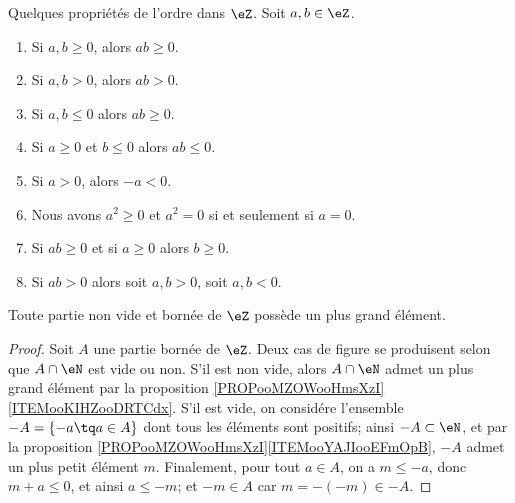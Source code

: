 \begin{proposition}	\label{PROPooYFUBooJUZgwH}
	Quelques propriétés de l'ordre dans \( \eZ\). Soit \( a, b \in \eZ\).
	\begin{enumerate}
		\item		\label{ITEMooULKWooLmKBse}
		      Si \( a,b\geq 0\), alors \( ab\geq 0\).
		\item	\label{ITEMooSAJPooEDSgXJ}
		      Si \( a,b>0\), alors \( ab>0\).
		\item		\label{ITEMooINGNooOgSGiF}
		      Si \( a,b\leq 0\) alors \( ab\geq 0\).
		\item	\label{ITEMooOGFXooDvLKAE}
		      Si \( a\geq 0\) et \( b\leq 0\) alors \( ab\leq 0\).
		\item	\label{ITEMooRelatifsOrdreOppose}
		      Si \( a>0\), alors \( -a<0\).
		\item	\label{ITEMooRelatifsOrdreCarrePositif}
		      Nous avons \( a^2\geq 0\) et \( a^2=0\) si et seulement si \( a=0\).
		\item		\label{ITEMooBUHIooLJOSLQ}
		      Si \( ab\geq 0\) et si \( a\geq 0\) alors \( b\geq 0\).
		\item		\label{ITEMooGDFPooBbpBgn}
		      Si \( ab>0\) alors soit \( a,b>0\), soit \( a,b<0\).
	\end{enumerate}
\end{proposition}

\begin{lemma}       \label{LEMooMYEIooNFwNVI}
	Toute partie non vide et bornée de \( \eZ\) possède un plus grand élément.
\end{lemma}

\begin{proof}
	Soit \( A \) une partie bornée de \( \eZ\). Deux cas de figure se produisent selon que \( A \cap \eN \) est vide ou non. S'il est non vide, alors \( A \cap \eN \) admet un plus grand élément par la proposition \ref{PROPooMZOWooHmsXzI}\ref{ITEMooKIHZooDRTCdx}. S'il est vide, on considére l'ensemble \( -A = \{-a \tq a \in A \} \) dont tous les éléments sont positifs; ainsi \( -A \subset \eN \), et par la proposition \ref{PROPooMZOWooHmsXzI}\ref{ITEMooYAJIooEFmOpB}, \( -A \) admet un plus petit élément \( m \). Finalement, pour tout \( a \in A \), on a \( m \leq -a \), donc \( m+a \leq 0 \), et ainsi \( a \leq -m \); et \( -m \in A \) car \( m = -(-m) \in -A \).
\end{proof}

